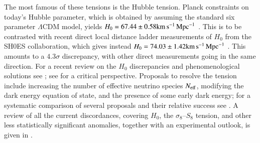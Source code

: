 The most famous of these tensions is the Hubble tension.  Planck constraints on today's Hubble parameter, which is obtained by assuming the standard six parameter $\Lambda$CDM model, yields $H_0 = 67.44 \pm 0.58 {\rm km}\,{\rm s}^{-1}\,{\rm Mpc}^{-1}$ \cite{Planck:2018vyg}.  This is to be contrasted with recent direct local distance ladder measurements of $H_0$ from the SH0ES collaboration, which gives instead $H_0 = 74.03 \pm 1.42 {\rm km}\,{\rm s}^{-1}\,{\rm Mpc}^{-1}$ \cite{Riess:2019cxk}. This amounts to a $4.3\sigma$ discrepancy, with other direct measurements going in the same direction.  For a recent review on the $H_0$ discrepancies and phenomenological solutions see \cite{DiValentino:2021izs}; see \cite{Efstathiou:2020wxn} for a critical perspective. Proposals to resolve the tension include increasing the number of effective neutrino species $N_{\rm eff}$, modifying the dark energy equation of state, and the presence of some early dark energy; for a systematic comparison of several proposals and their relative success see \cite{Schoneberg:2021qvd}.  A review of all the current discordances, covering $H_0$, the $\sigma_8$--$S_8$ tension, and other less statistically significant anomalies, together with an experimental outlook, is given in \cite{Abdalla:2022yfr}.




\newpage
